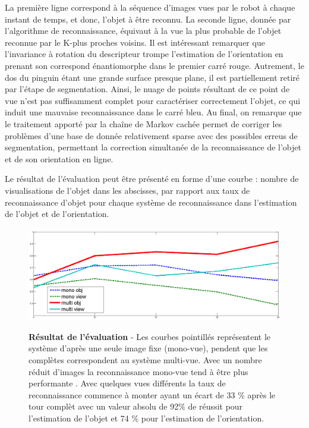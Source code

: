 La première ligne correspond à la séquence d'images vues par le robot à chaque instant de temps, et donc, l'objet à être reconnu. La seconde ligne, donnée par l'algorithme de reconnaissance, équivaut à la vue la plus probable de l'objet reconnue par le K-plus proches voisins. Il est intéressant remarquer que l'invariance à rotation du descripteur trompe l'estimation de l'orientation en prenant son correspond énantiomorphe dans le premier carré rouge. Autrement, le dos du pinguin étant une grande surface presque plane, il est partiellement retiré par l'étape de segmentation. Ainsi, le nuage de points résultant de ce point de vue n'est pas suffisamment complet pour caractériser correctement l'objet, ce qui induit une mauvaise reconnaissance dans le carré bleu. Au final, on remarque que le traitement apporté par la chaîne de Markov cachée permet de corriger les problèmes d'une base de donnée relativement sparse avec des possibles erreus de segmentation, permettant la correction simultanée de la reconnaissance de l'objet et de son orientation en ligne. 

Le résultat de l'évaluation peut être présenté en forme d'une courbe : nombre de visualisations de l'objet dans les abscisses, par rapport aux taux de reconnaissance d'objet pour chaque système de reconnaissance dans l'estimation de l'objet et de l'orientation.

\begin{figure}[H]
	\includegraphics[width=\textwidth]{comp.png}
	\label{fig:comp}
	\caption{\textbf{Résultat de l'évaluation} - Les courbes pointillés représentent le système d'après une seule image fixe (mono-vue), pendent que les complètes correspondent au système multi-vue. Avec un nombre réduit d'images la reconnaissance mono-vue tend à être plus performante . Avec quelques vues différents la taux de reconnaissance commence à monter ayant un écart de 33 \% après le tour complèt avec un valeur absolu de 92\% de réussit pour l'estimation de l'objet et 74 \% pour l'estimation de l'orientation. }		
\end{figure}

